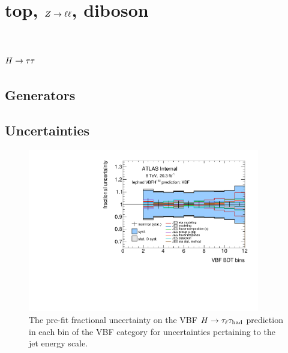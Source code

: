 \clearpage

\section{top, $Z \rightarrow \ell\ell$, diboson}
\label{sec:backgrounds-others}

\section{$H\rightarrow\tau\tau$}
\label{sec:backgrounds-htautau}

\subsection{Generators}

\subsection{Uncertainties}

\begin{figure}[tp]
  \includegraphics[width=0.90\textwidth]{figures/uncertainties/uncertainties_lephad_paper14_8TeV_VBFH125_JES_VBF}
  \caption{The pre-fit fractional uncertainty on the VBF $H\rightarrow\tau_\ell\tau_\text{had}$ prediction in each bin of the VBF category for uncertainties pertaining to the jet energy scale.}
  \label{fig:backgrounds-uncertainties-vbfjes}
\end{figure}

